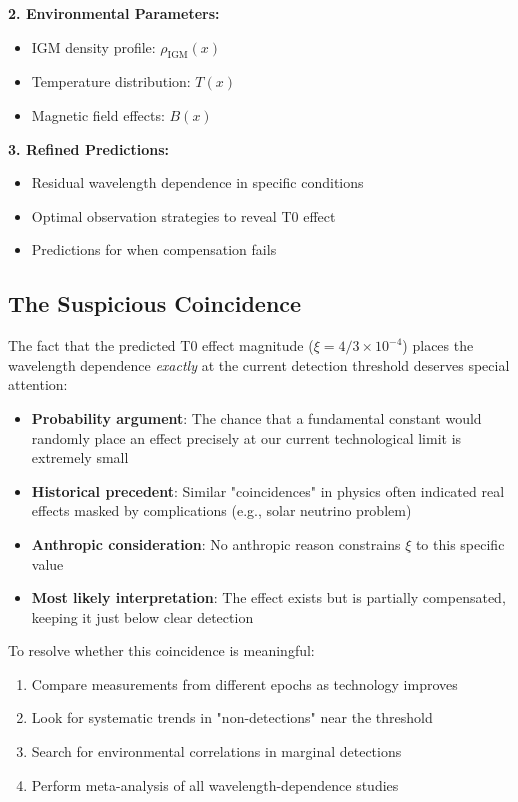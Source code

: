 \documentclass[12pt,a4paper]{article}
\theoremstyle{definition}
\begin{document}
	\textbf{2. Environmental Parameters:}
	\begin{itemize}
		\item IGM density profile: $\rho_{\text{IGM}}(x)$
		\item Temperature distribution: $T(x)$
		\item Magnetic field effects: $B(x)$
	\end{itemize}
	
	\textbf{3. Refined Predictions:}
	\begin{itemize}
		\item Residual wavelength dependence in specific conditions
		\item Optimal observation strategies to reveal T0 effect
		\item Predictions for when compensation fails
	\end{itemize}
	
	\subsection{The Suspicious Coincidence}
	
	The fact that the predicted T0 effect magnitude ($\xi = 4/3 \times 10^{-4}$) places the wavelength dependence \textit{exactly} at the current detection threshold deserves special attention:
	
	\begin{itemize}
		\item \textbf{Probability argument}: The chance that a fundamental constant would randomly place an effect precisely at our current technological limit is extremely small
		\item \textbf{Historical precedent}: Similar "coincidences" in physics often indicated real effects masked by complications (e.g., solar neutrino problem)
		\item \textbf{Anthropic consideration}: No anthropic reason constrains $\xi$ to this specific value
		\item \textbf{Most likely interpretation}: The effect exists but is partially compensated, keeping it just below clear detection
	\end{itemize}
	
	\begin{experiment}[title=Testing the Coincidence]
		To resolve whether this coincidence is meaningful:
		\begin{enumerate}
			\item Compare measurements from different epochs as technology improves
			\item Look for systematic trends in "non-detections" near the threshold
			\item Search for environmental correlations in marginal detections
			\item Perform meta-analysis of all wavelength-dependence studies
		\end{enumerate}
	\end{experiment}
	
\end{document}
